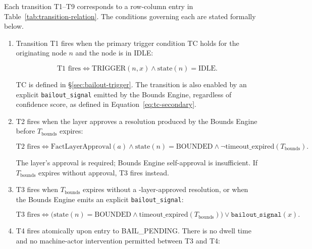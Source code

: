Each transition T1–T9 corresponds to a row-column entry in Table~\ref{tab:transition-relation}. The conditions governing each are stated formally below.

\begin{enumerate}
\item[\textbf{T1 (IDLE $\rightarrow$ BOUNDED).}] Transition T1 fires when the primary trigger condition TC holds for the originating node $n$ and the node is in IDLE:

\begin{equation}
\text{T1 fires} \iff \text{TRIGGER}(n, x) \land \text{state}(n) = \text{IDLE}. \tag{T1}
\end{equation}

TC is defined in \S\ref{sec:bailout-trigger}. The transition is also enabled by an explicit \texttt{bailout\_signal} emitted by the Bounds Engine, regardless of confidence score, as defined in Equation~\ref{eq:tc-secondary}.

\item[\textbf{T2 (BOUNDED $\rightarrow$ IDLE).}] T2 fires when the \fact{} layer approves a resolution produced by the Bounds Engine before $T_{\text{bounds}}$ expires:

\begin{equation}
\text{T2 fires} \iff \text{FactLayerApproval}(a) \land \text{state}(n) = \text{BOUNDED} \land \neg\text{timeout\_expired}(T_{\text{bounds}}). \tag{T2}
\end{equation}

The \fact{} layer's approval is required; Bounds Engine self-approval is insufficient. If $T_{\text{bounds}}$ expires without approval, T3 fires instead.

\item[\textbf{T3 (BOUNDED $\rightarrow$ BAIL\_PENDING).}] T3 fires when $T_{\text{bounds}}$ expires without a \fact-layer-approved resolution, or when the Bounds Engine emits an explicit \texttt{bailout\_signal}:

\begin{equation}
\text{T3 fires} \iff \bigl(\text{state}(n) = \text{BOUNDED} \land \text{timeout\_expired}(T_{\text{bounds}})\bigr) \lor \texttt{bailout\_signal}(x). \tag{T3}
\end{equation}

\item[\textbf{T4 (BAIL\_PENDING $\rightarrow$ ESCALATING).}] T4 fires atomically upon entry to BAIL\_PENDING. There is no dwell time and no machine-actor intervention permitted between T3 and T4:


\end{enumerate}
